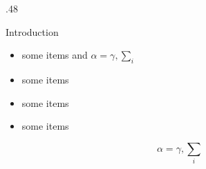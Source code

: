 \documentclass[final,unknownkeysallowed]{beamer}
\begin{document}
\begin{frame}{}
\begin{columns}[t]
\begin{column}{.48\linewidth}
        \begin{block}{Introduction}
          \begin{itemize}
          \item some items and $\alpha=\gamma, \sum_{i}$
          \item some items
          \item some items
          \item some items
          \end{itemize}
          $$\alpha=\gamma, \sum_{i}$$
        \end{block}
      \end{column}
    \end{columns}
  \end{frame}
  
\end{document}

